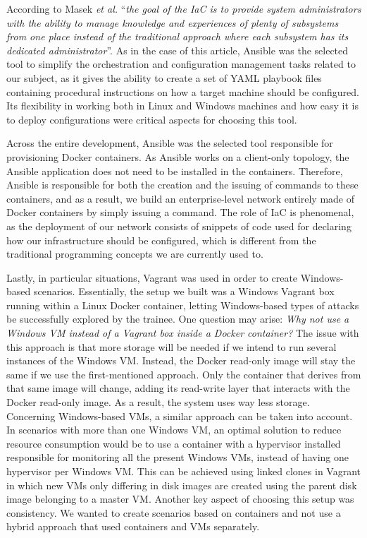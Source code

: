 According to Masek \textit{et al.} \cite{unleashing_full_potential_of_ansible_ref} ``\textit{the goal of the IaC is to provide system administrators with the ability to manage knowledge and experiences of plenty of subsystems from one place instead of the traditional approach where each subsystem has its dedicated administrator}''. As in the case of this article, Ansible was the selected tool to simplify the orchestration and configuration management tasks related to our subject, as it gives the ability to create a set of YAML playbook files containing procedural instructions on how a target machine should be configured. Its flexibility in working both in Linux and Windows machines and how easy it is to deploy configurations were critical aspects for choosing this tool. 

Across the entire development, Ansible was the selected tool responsible for provisioning Docker containers. As Ansible works on a client-only topology, the Ansible application does not need to be installed in the containers. Therefore, Ansible is responsible for both the creation and the issuing of commands to these containers, and as a result, we build an enterprise-level network entirely made of Docker containers by simply issuing a command. The role of IaC is phenomenal, as the deployment of our network consists of snippets of code used for declaring how our infrastructure should be configured, which is different from the traditional programming concepts we are currently used to.

Lastly, in particular situations, Vagrant was used in order to create Windows-based scenarios. Essentially, the setup we built was a Windows Vagrant box running within a Linux Docker container, letting Windows-based types of attacks be successfully explored by the trainee. One question may arise: \textit{Why not use a Windows VM instead of a Vagrant box inside a Docker container?} The issue with this approach is that more storage will be needed if we intend to run several instances of the Windows VM. Instead, the Docker read-only image will stay the same if we use the first-mentioned approach.
Only the container that derives from that same image will change, adding its read-write layer that interacts with the Docker read-only image. As a result, the system uses way less storage. Concerning Windows-based VMs, a similar approach can be taken into account. In scenarios with more than one Windows VM, an optimal solution to reduce resource consumption would be to use a container with a hypervisor installed responsible for monitoring all the present Windows VMs, instead of having one hypervisor per Windows VM. This can be achieved using linked clones in Vagrant in which new VMs only differing in disk images are created using the parent disk image belonging to a master VM. Another key aspect of choosing this setup was consistency. We wanted to create scenarios based on containers and not use a hybrid approach that used containers and VMs separately.

